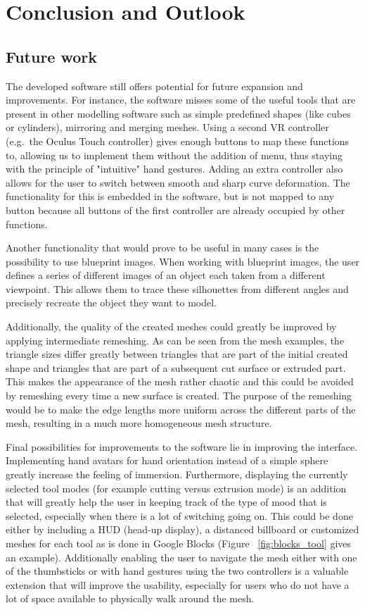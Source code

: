 \chapter{Conclusion and Outlook}
\label{chap:conclusion}

\section{Future work}
The developed software still offers potential for future expansion and improvements. For instance, the software misses some of the useful tools that are present in other modelling software such as simple predefined shapes (like cubes or cylinders), mirroring and merging meshes. Using a second VR controller (e.g.\ the Oculus Touch controller) gives enough buttons to map these functions to, allowing us to implement them without the addition of menu, thus staying with the principle of "intuitive" hand gestures. Adding an extra controller also allows for the user to switch between smooth and sharp curve deformation. The functionality for this is embedded in the software, but is not mapped to any button because all buttons of the first controller are already occupied by other functions. 

Another functionality that would prove to be useful in many cases is the possibility to use blueprint images. When working with blueprint images, the user defines a series of different images of an object each taken from a different viewpoint. This allows them to trace these silhouettes from different angles and precisely recreate the object they want to model.

Additionally, the quality of the created meshes could greatly be improved by applying intermediate remeshing. As can be seen from the mesh examples, the triangle sizes differ greatly between triangles that are part of the initial created shape and triangles that are part of a subsequent cut surface or extruded part. This makes the appearance of the mesh rather chaotic and this could be avoided by remeshing every time a new surface is created. The purpose of the remeshing would be to make the edge lengths more uniform across the different parts of the mesh, resulting in a much more homogeneous mesh structure.

Final possibilities for improvements to the software lie in improving the interface. Implementing hand avatars for hand orientation instead of a simple sphere greatly increase the feeling of immersion. Furthermore, displaying the currently selected tool modes (for example cutting versus extrusion mode) is an addition that will greatly help the user in keeping track of the type of mood that is selected, especially when there is a lot of switching going on. This could be done either by including a HUD (head-up display), a distanced billboard or customized meshes for each tool as is done in Google Blocks (Figure ~\ref{fig:blocks_tool} gives an example). Additionally enabling the user to navigate the mesh either with one of the thumbsticks or with hand gestures using the two controllers is a valuable extension that will improve the usability, especially for users who do not have a lot of space available to physically walk around the mesh. 

